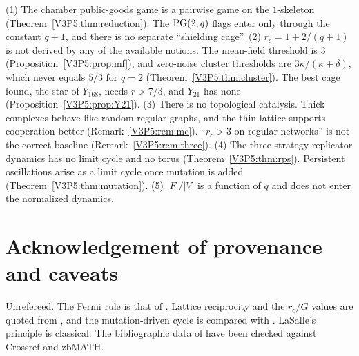 \begin{remark}\label{V3P5:rem:corrections}
(1) The chamber public-goods game is a pairwise game on the $1$-skeleton
(Theorem~\ref{V3P5:thm:reduction}). The $\mathrm{PG}(2,q)$ flags enter only through the constant
$q+1$, and there is no separate ``shielding cage''. (2) $r_c=1+2/(q+1)$ is not derived by any
of the available notions. The mean-field threshold is $3$ (Proposition~\ref{V3P5:prop:mf}),
and zero-noise cluster thresholds are $3\kappa/(\kappa+\delta)$, which never equals $5/3$ for
$q=2$ (Theorem~\ref{V3P5:thm:cluster}). The best cage found, the star of $Y_{168}$, needs
$r>7/3$, and $Y_{21}$ has none (Proposition~\ref{V3P5:prop:Y21}). (3) There is no topological
catalysis. Thick complexes behave like random regular graphs, and the thin lattice supports
cooperation better (Remark~\ref{V3P5:rem:mc}). ``$r_c>3$ on regular networks'' is not the
correct baseline (Remark~\ref{V3P5:rem:three}). (4) The three-strategy replicator dynamics has
no limit cycle and no torus (Theorem~\ref{V3P5:thm:rps}). Persistent oscillations arise as a
limit cycle once mutation is added (Theorem~\ref{V3P5:thm:mutation}). (5) $|F|/|V|$ is a
function of $q$ and does not enter the normalized dynamics.
\end{remark}

\section*{Acknowledgement of provenance and caveats}

Unrefereed. The Fermi rule is that of \cite{ST98}. Lattice reciprocity and the $r_c/G$ values
are quoted from \cite{NM92,SPS09}, and the mutation-driven cycle is compared with \cite{Mob10}.
LaSalle's principle \cite{LaSalle60} is classical. The bibliographic data of
\cite{ST98,NM92,SPS09,Mob10} have been checked against Crossref and zbMATH.




